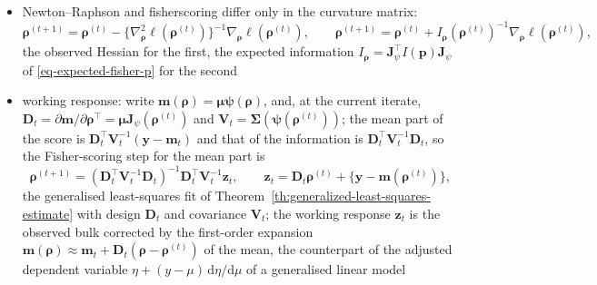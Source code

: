 \begin{itemize}
  \item Newton--Raphson and \gls{fisherscoring} differ only in the curvature matrix:
        \begin{equation}
          \boldsymbol{\rho}^{(t+1)}=\boldsymbol{\rho}^{(t)}-\{\nabla^{2}_{\boldsymbol{\rho}}\ell(\boldsymbol{\rho}^{(t)})\}^{-1}\nabla_{\boldsymbol{\rho}}\ell(\boldsymbol{\rho}^{(t)}),
          \qquad
          \boldsymbol{\rho}^{(t+1)}=\boldsymbol{\rho}^{(t)}+I_{\boldsymbol{\rho}}(\boldsymbol{\rho}^{(t)})^{-1}\nabla_{\boldsymbol{\rho}}\ell(\boldsymbol{\rho}^{(t)}),
          \label{eq-newton-fisher}
        \end{equation}
        the observed Hessian for the first, the expected information
        \(I_{\boldsymbol{\rho}}=\mathbf{J}_{\psi}^{\top}I(\boldsymbol{p})\mathbf{J}_{\psi}\) of \eqref{eq-expected-fisher-p} for the second
  \item working response: write \(\boldsymbol{m}(\boldsymbol{\rho})=\boldsymbol{\mu}\boldsymbol{\psi}(\boldsymbol{\rho})\), and, at the current iterate,
        \(\boldsymbol{D}_{t}=\partial\boldsymbol{m}/\partial\boldsymbol{\rho}^{\top}=\boldsymbol{\mu}\mathbf{J}_{\psi}(\boldsymbol{\rho}^{(t)})\) and
        \(\boldsymbol{V}_{t}=\boldsymbol{\Sigma}(\boldsymbol{\psi}(\boldsymbol{\rho}^{(t)}))\); the mean part of the score is
        \(\boldsymbol{D}_{t}^{\top}\boldsymbol{V}_{t}^{-1}(\boldsymbol{y}-\boldsymbol{m}_{t})\) and that of the information is \(\boldsymbol{D}_{t}^{\top}\boldsymbol{V}_{t}^{-1}\boldsymbol{D}_{t}\), so the
        Fisher-scoring step for the mean part is
        \begin{equation}
          \boldsymbol{\rho}^{(t+1)}=(\boldsymbol{D}_{t}^{\top}\boldsymbol{V}_{t}^{-1}\boldsymbol{D}_{t})^{-1}\boldsymbol{D}_{t}^{\top}\boldsymbol{V}_{t}^{-1}\boldsymbol{z}_{t},
          \qquad
          \boldsymbol{z}_{t}=\boldsymbol{D}_{t}\boldsymbol{\rho}^{(t)}+\{\boldsymbol{y}-\boldsymbol{m}(\boldsymbol{\rho}^{(t)})\},
          \label{eq-irls}
        \end{equation}
        the generalised least-squares fit of Theorem~\ref{th:generalized-least-squares-estimate} with design \(\boldsymbol{D}_{t}\) and
        covariance \(\boldsymbol{V}_{t}\); the working response \(\boldsymbol{z}_{t}\) is the observed bulk corrected by the first-order
        expansion \(\boldsymbol{m}(\boldsymbol{\rho})\approx\boldsymbol{m}_{t}+\boldsymbol{D}_{t}(\boldsymbol{\rho}-\boldsymbol{\rho}^{(t)})\) of the mean, the counterpart of the adjusted
        dependent variable \(\eta+(y-\mu)\,\mathrm{d}\eta/\mathrm{d}\mu\) of a generalised linear model

\end{itemize}
